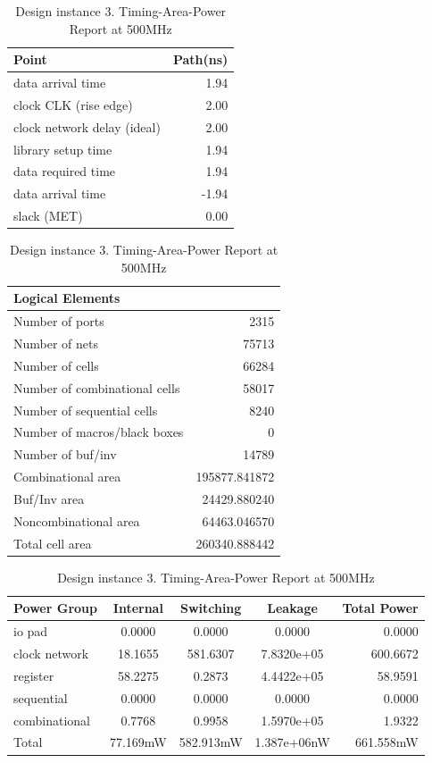 \documentclass[journal,comsoc]{IEEEtran}
\begin{document}
\begin{table} 
	\centering
	\caption{Design instance 3. Timing-Area-Power Report at 500MHz}			
	\begin{tabular}{@{}lr@{}}
		Point 						& Path(ns)\\
		\hline\hline
		data arrival time   		&1.94\\ 
		clock CLK (rise edge)  		&2.00\\
		clock network delay (ideal) &2.00\\
		library setup time			&1.94\\
		\hline
		data required time			&1.94\\
		data arrival time           &-1.94\\
		\hline
		slack (MET)                 &0.00\\	
		\hline
	\end{tabular}
	
	\begin{tabular}{@{}lr@{}}\\
		Logical Elements\\
		\hline\hline
		Number of ports                &2315\\
		Number of nets                 &75713\\
		Number of cells                &66284\\
		Number of combinational cells  &58017\\
		Number of sequential cells     &8240\\
		Number of macros/black boxes   &0\\
		Number of buf/inv              &14789\\
		\hline
		Combinational area             &195877.841872\\
		Buf/Inv area                   &24429.880240\\
		Noncombinational area          &64463.046570\\
		\hline
		Total cell area                &260340.888442\\	
		\hline
	\end{tabular}

	\begin{tabular}{@{}lcccr@{}}\\
		Power Group		 &Internal 	&Switching 	&Leakage		&Total Power\\
		\hline\hline
		io pad           &0.0000    &0.0000     &0.0000    		&0.0000\\
		clock network    &18.1655   &581.6307   &7.8320e+05 	&600.6672\\
		register         &58.2275   &0.2873     &4.4422e+05 	&58.9591\\  
		sequential       &0.0000    &0.0000     &0.0000     	&0.0000\\  
		combinational    &0.7768    &0.9958     &1.5970e+05 	&1.9322\\ 
		\hline
		Total            &77.169mW  &582.913mW  &1.387e+06nW	&661.558mW\\	
		\hline
	\end{tabular}	
	\label{tab:rep_desgin3}
\end{table}
\end{document}
